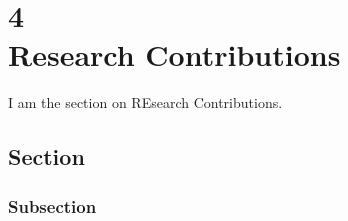 \chapter[Research Contributions]{4\\Research Contributions}
\label{chap:res}
I am the section on REsearch Contributions.

\section{Section}
\label{sec:name}
\subsection{Subsection}
\label{ssec:name}

